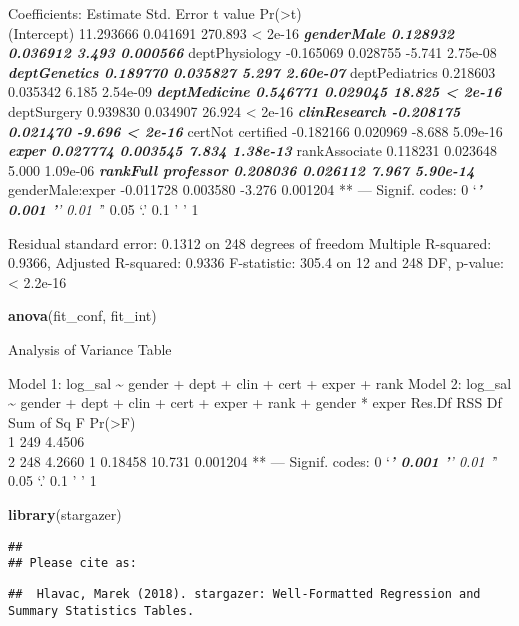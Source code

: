 \documentclass[]{article}
\newenvironment{Shaded}{\begin{snugshade}}{\end{snugshade}}
\newcommand{\KeywordTok}[1]{\textcolor[rgb]{0.13,0.29,0.53}{\textbf{#1}}}
\newcommand{\NormalTok}[1]{#1}
\begin{document}
Coefficients: Estimate Std. Error t value
Pr(\textgreater{}\textbar{}t\textbar{})\\
(Intercept) 11.293666 0.041691 270.893 \textless{} 2e-16 \textbf{\emph{
genderMale 0.128932 0.036912 3.493 0.000566 }} deptPhysiology -0.165069
0.028755 -5.741 2.75e-08 \textbf{\emph{ deptGenetics 0.189770 0.035827
5.297 2.60e-07 }} deptPediatrics 0.218603 0.035342 6.185 2.54e-09
\textbf{\emph{ deptMedicine 0.546771 0.029045 18.825 \textless{} 2e-16
}} deptSurgery 0.939830 0.034907 26.924 \textless{} 2e-16 \textbf{\emph{
clinResearch -0.208175 0.021470 -9.696 \textless{} 2e-16 }} certNot
certified -0.182166 0.020969 -8.688 5.09e-16 \textbf{\emph{ exper
0.027774 0.003545 7.834 1.38e-13 }} rankAssociate 0.118231 0.023648
5.000 1.09e-06 \textbf{\emph{ rankFull professor 0.208036 0.026112 7.967
5.90e-14 }} genderMale:exper -0.011728 0.003580 -3.276 0.001204 ** ---
Signif. codes: 0 `\emph{\textbf{' 0.001 '}' 0.01 '}' 0.05 `.' 0.1 ' ' 1

Residual standard error: 0.1312 on 248 degrees of freedom Multiple
R-squared: 0.9366, Adjusted R-squared: 0.9336 F-statistic: 305.4 on 12
and 248 DF, p-value: \textless{} 2.2e-16

\begin{Shaded}
\begin{Highlighting}[]
\KeywordTok{anova}\NormalTok{(fit_conf, fit_int)}
\end{Highlighting}
\end{Shaded}

Analysis of Variance Table

Model 1: log\_sal \textasciitilde{} gender + dept + clin + cert + exper
+ rank Model 2: log\_sal \textasciitilde{} gender + dept + clin + cert +
exper + rank + gender * exper Res.Df RSS Df Sum of Sq F
Pr(\textgreater{}F)\\
1 249 4.4506\\
2 248 4.2660 1 0.18458 10.731 0.001204 ** --- Signif. codes: 0
`\emph{\textbf{' 0.001 '}' 0.01 '}' 0.05 `.' 0.1 ' ' 1

\begin{Shaded}
\begin{Highlighting}[]
\KeywordTok{library}\NormalTok{(stargazer)}
\end{Highlighting}
\end{Shaded}

\begin{verbatim}
## 
## Please cite as:
\end{verbatim}

\begin{verbatim}
##  Hlavac, Marek (2018). stargazer: Well-Formatted Regression and Summary Statistics Tables.
\end{verbatim}
\end{document}
